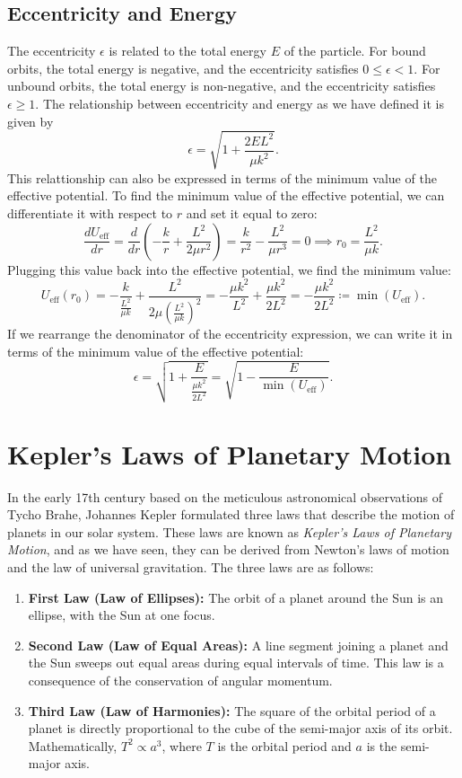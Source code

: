 \documentclass[12pt]{article}
\begin{document}
\subsection{Eccentricity and Energy}
The eccentricity $\epsilon$ is related to the total energy $E$ of the particle. For bound orbits, the total energy is negative, and the eccentricity satisfies $0 \leq \epsilon < 1$. For unbound orbits, the total energy is non-negative, and the eccentricity satisfies $\epsilon \geq 1$. The relationship between eccentricity and energy as we have defined it is given by
\[
    \epsilon = \sqrt{1+\frac{2EL^2}{\mu k^2}}.
\]
This relattionship can also be expressed in terms of the minimum value of the effective potential. To find the minimum value of the effective potential, we can differentiate it with respect to $r$ and set it equal to zero:
\[
    \frac{dU_{\mathrm{eff}}}{dr} =\frac{d}{dr} \left( -\frac{k}{r} + \frac{L^2}{2\mu r^2} \right) = \frac{k}{r^2} - \frac{L^2}{\mu r^3} = 0 \implies r_0 = \frac{L^2}{\mu k}.
\]
Plugging this value back into the effective potential, we find the minimum value:
\[
    U_{\mathrm{eff}}(r_0) = -\frac{k}{\frac{L^2}{\mu k}} + \frac{L^2}{2\mu \left(\frac{L^2}{\mu k}\right)^2} = -\frac{\mu k^2}{L^2} + \frac{\mu k^2}{2L^2} = -\frac{\mu k^2}{2L^2} \coloneqq \min{(U_\mathrm{eff})}.
\]
If we rearrange the denominator of the eccentricity expression, we can write it in terms of the minimum value of the effective potential:
\[
    \epsilon = \sqrt{1+\frac{E}{\frac{\mu k^2}{2L^2}}} = \sqrt{1-\frac{E}{\min{(U_\mathrm{eff})}}} .
    \]


\section{Kepler's Laws of Planetary Motion}
In the early 17th century based on the meticulous astronomical observations of Tycho Brahe, Johannes Kepler formulated three laws that describe the motion of planets in our solar system. These laws are known as \emph{Kepler's Laws of Planetary Motion}, and as we have seen, they can be derived from Newton's laws of motion and the law of universal gravitation. The three laws are as follows:

\begin{enumerate}
    \item \textbf{First Law (Law of Ellipses):} The orbit of a planet around the Sun is an ellipse, with the Sun at one focus.
    \item \textbf{Second Law (Law of Equal Areas):} A line segment joining a planet and the Sun sweeps out equal areas during equal intervals of time. This law is a consequence of the conservation of angular momentum.
    \item \textbf{Third Law (Law of Harmonies):} The square of the orbital period of a planet is directly proportional to the cube of the semi-major axis of its orbit. Mathematically, \(T^2 \propto a^3\), where \(T\) is the orbital period and \(a\) is the semi-major axis.
\end{enumerate}
\end{document}
